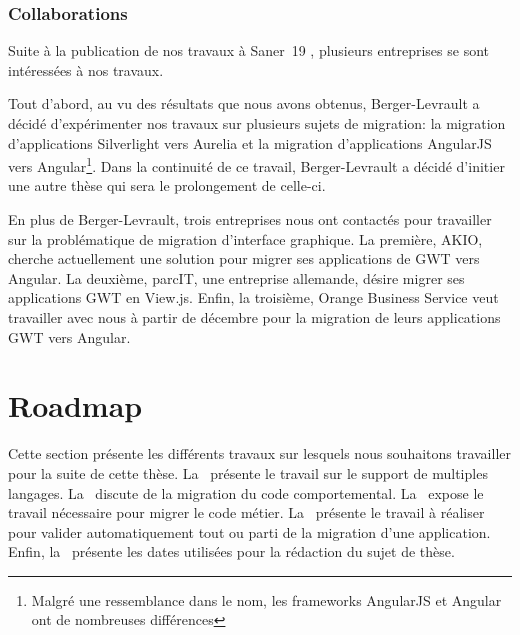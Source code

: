 \documentclass[a4paper]{article}
\begin{document}
\subsubsection{Collaborations}
\label{sec:impact}

Suite à la publication de nos travaux à Saner~19 \citep{Verh19a}, plusieurs entreprises se sont intéressées à nos travaux.

Tout d'abord, au vu des résultats que nous avons obtenus, 
  Berger-Levrault a décidé d'expérimenter nos travaux sur plusieurs sujets de migration:
  la migration d'applications Silverlight vers Aurelia et la migration d'applications AngularJS vers Angular\footnote{Malgré une ressemblance dans le nom, les frameworks AngularJS et Angular ont de nombreuses différences}.
Dans la continuité de ce travail, Berger-Levrault a décidé d'initier une autre thèse qui sera le prolongement de celle-ci.

En plus de Berger-Levrault, trois entreprises nous ont contactés pour travailler sur la problématique de migration d'interface graphique.
La première, AKIO, cherche actuellement une solution pour migrer ses applications de GWT vers Angular.
La deuxième, parcIT, une entreprise allemande, désire migrer ses applications GWT en View.js.
Enfin, la troisième, Orange Business Service veut travailler avec nous à partir de décembre pour la migration de leurs applications GWT vers Angular.

\section{Roadmap}
\label{sec:roadmap}

Cette section présente les différents travaux sur lesquels nous souhaitons travailler pour la suite de cette thèse.
La~ présente le travail sur le support de multiples langages.
La~ discute de la migration du code comportemental.
La~ expose le travail nécessaire pour migrer le code métier.
La~ présente le travail à réaliser pour valider automatiquement tout ou parti de la migration d'une application.
Enfin, la~ présente les dates utilisées pour la rédaction du sujet de thèse.
\end{document}
